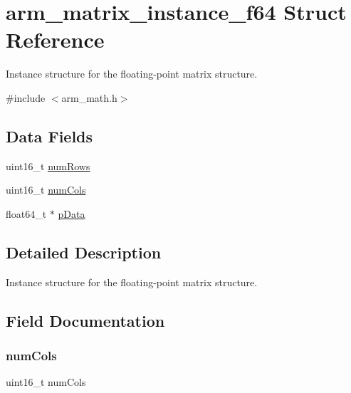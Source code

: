 \hypertarget{structarm__matrix__instance__f64}{}\section{arm\+\_\+matrix\+\_\+instance\+\_\+f64 Struct Reference}
\label{structarm__matrix__instance__f64}


Instance structure for the floating-\/point matrix structure.  




{\ttfamily \#include $<$arm\+\_\+math.\+h$>$}

\subsection*{Data Fields}
\begin{DoxyCompactItemize}
\item 
uint16\+\_\+t \hyperlink{structarm__matrix__instance__f64_a1bcf80ccdc2acc29198f1592ae300390}{num\+Rows}
\item 
uint16\+\_\+t \hyperlink{structarm__matrix__instance__f64_a4bb5ec0d13eb4c9cf887aa8366a44117}{num\+Cols}
\item 
float64\+\_\+t $\ast$ \hyperlink{structarm__matrix__instance__f64_aa7a4c9839c31e933360ef3a3167b9877}{p\+Data}
\end{DoxyCompactItemize}


\subsection{Detailed Description}
Instance structure for the floating-\/point matrix structure. 

\subsection{Field Documentation}
\mbox{\label{structarm__matrix__instance__f64_a4bb5ec0d13eb4c9cf887aa8366a44117}} 
\subsubsection{\texorpdfstring{num\+Cols}{numCols}}
{\footnotesize\ttfamily uint16\+\_\+t num\+Cols}


